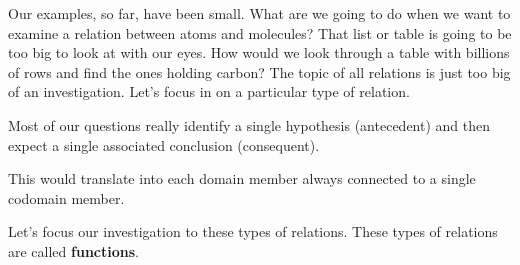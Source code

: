 \documentclass{ximera}
\begin{document}
Our examples, so far, have been small.  What are we going to do when we want to examine a relation between atoms and molecules?  That list or table is going to be too big to look at with our eyes.  How would we look through a table with billions of rows and find the ones holding carbon?  The topic of all relations is just too big of an investigation. Let's focus in on a particular type of relation.

Most of our questions really identify a single hypothesis (antecedent) and then expect a single associated conclusion (consequent).

This would translate into each domain member always connected to a single codomain member.

Let's focus our investigation to these types of relations.  These types of relations are called \textbf{functions}.
\end{document}

